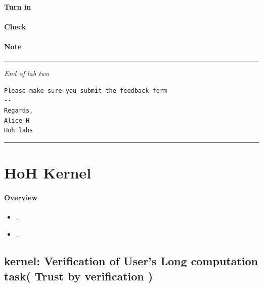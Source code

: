 \documentclass[]{book}
\begin{document}
\subsubsection*{Turn in}\label{turn-in-17}

\subsubsection*{Check}\label{check-17}

\subsubsection*{Note}\label{note-19}

\begin{center}\rule{0.5\linewidth}{\linethickness}\end{center}

\emph{End of lab two}

\begin{verbatim}
Please make sure you submit the feedback form
--
Regards,
Alice H
Hoh labs
\end{verbatim}

\begin{center}\rule{0.5\linewidth}{\linethickness}\end{center}

\chapter{HoH Kernel}\label{hoh-kernel}

\subsubsection*{Overview}\label{overview-2}

\begin{itemize}
\itemsep1pt\parskip0pt
\item
  .
\item
  .
\end{itemize}

\section{kernel: Verification of User's Long computation task( Trust by
verification
)}\label{kernel-verification-of-users-long-computation-task-trust-by-verification}
\end{document}
